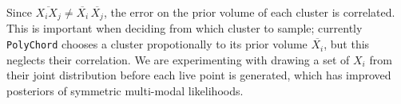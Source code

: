 \documentclass[25pt, a0paper, portrait]{tikzposter}
\newcommand{\polychord}{\texttt{PolyChord}}
\begin{document}
\begin{columns}
{\begin{minipage}{0.22\textwidth}
        \end{minipage}\hfill
        \begin{minipage}{0.22\textwidth}
        \end{minipage}

        Since $\overline{X_iX_j} \neq \overline{X_i}\,\overline{X_j}$, the error on the prior volume of each cluster is correlated. This is important when deciding from which cluster to sample; currently \polychord{} chooses a cluster propotionally to its prior volume $\overline{X_i}$, but this neglects their correlation. We are experimenting with drawing a set of $X_i$ from their joint distribution before each live point is generated, which has improved posteriors of symmetric multi-modal likelihoods.\\

    }
    


    \renewcommand{\section}[2]{}%

\end{columns}
\end{document}
